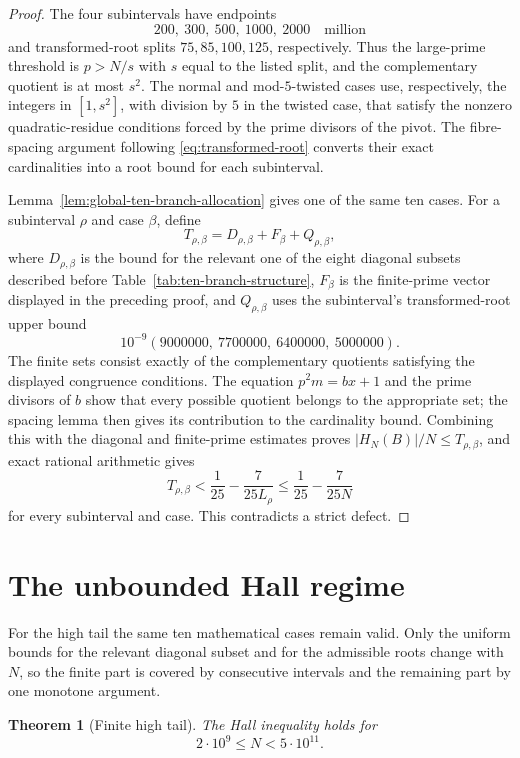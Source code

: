 \documentclass[11pt]{article}
\newtheorem{theorem}{Theorem}[section]
\theoremstyle{definition}
\newcommand{\TwoBillion}{2\cdot10^9}
\newcommand{\FiveHundredBillion}{5\cdot10^{11}}
\begin{document}
\begin{proof}
The four subintervals have endpoints
\[
 200,\ 300,\ 500,\ 1000,\ 2000
\quad\text{million}
\]
and transformed-root splits $75,85,100,125$, respectively.  Thus the
large-prime threshold is $p>N/s$ with $s$ equal to the listed split, and the
complementary quotient is at most $s^2$.  The normal and mod-$5$-twisted
cases use, respectively, the integers in $[1,s^2]$, with division by $5$ in
the twisted case, that satisfy the nonzero quadratic-residue conditions
forced by the prime divisors of the pivot.  The fibre-spacing argument following
 \eqref{eq:transformed-root} converts their exact cardinalities into a root
 bound for each subinterval.

 Lemma~\ref{lem:global-ten-branch-allocation} gives one of the same ten
 cases.  For a subinterval $\rho$ and case $\beta$, define
\[
 T_{\rho,\beta}
 =D_{\rho,\beta}+F_\beta+Q_{\rho,\beta},
\]
where $D_{\rho,\beta}$ is the bound for the relevant one of the eight
diagonal subsets described before Table~\ref{tab:ten-branch-structure},
$F_\beta$ is the finite-prime vector displayed in the preceding proof, and
$Q_{\rho,\beta}$ uses the subinterval's transformed-root upper bound
\[
 10^{-9}(9000000,\ 7700000,\ 6400000,\ 5000000).
\]
 The finite sets consist exactly of the complementary quotients satisfying
 the displayed congruence conditions.  The equation $p^2m=bx+1$ and the prime
 divisors of $b$ show that every possible quotient belongs to the appropriate
 set; the spacing lemma then gives its contribution to the cardinality bound.
 Combining this with the
diagonal and finite-prime estimates proves
$|H_N(B)|/N\leq T_{\rho,\beta}$, and exact rational
arithmetic gives
\[
 T_{\rho,\beta}
 <\frac1{25}-\frac7{25L_\rho}
 \leq\frac1{25}-\frac7{25N}
\]
 for every subinterval and case.  This contradicts a strict defect.
\end{proof}

\section{The unbounded Hall regime}

For the high tail the same ten mathematical cases remain valid.  Only the
 uniform bounds for the relevant diagonal subset and for the admissible roots
 change with $N$, so the finite part is covered by consecutive
intervals and the remaining part by one monotone argument.

\begin{theorem}[Finite high tail]\label{thm:finite-high-tail}
The Hall inequality holds for
\[
 \TwoBillion\leq N<\FiveHundredBillion.
\]
\end{theorem}
\end{document}
